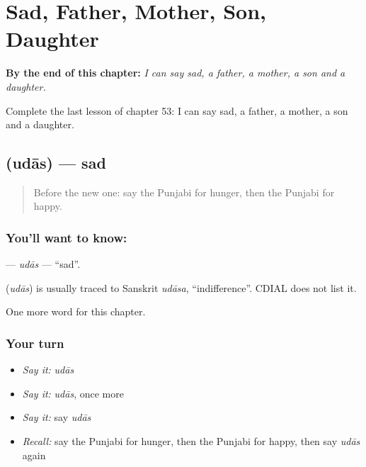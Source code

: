 
\chapter{Sad, Father, Mother, Son, Daughter}
\label{ch:pa-sad-father-mother-son-daughter}

\begin{chapteropening}
\textbf{By the end of this chapter:} \emph{I can say sad, a father, a mother, a son and a daughter.}

Complete the last lesson of chapter 53: I can say sad, a father, a mother, a son and a daughter.
\end{chapteropening}

\section[\texorpdfstring{\pa{ਉਦਾਸ} (udās)}{ਉਦਾਸ (udās)}]{ (udās) — sad}

\label{lesson:PA-C53-udas}



\begin{quote}
Before the new one: say the Punjabi for hunger, then the Punjabi for happy.
\end{quote}

\subsection*{You'll want to know: }
\textbf{} — \emph{udās} — \textquotedblleft{}sad\textquotedblright{}.

\begin{cousinweb}
\textbf{} (\emph{udās}) is usually traced to Sanskrit \emph{udāsa}, \textquotedblleft{}indifference\textquotedblright{}. CDIAL does not list it.
\end{cousinweb}

\begin{grammarlens}[title={What you've built}]
One more word for this chapter.
\end{grammarlens}

\subsection*{Your turn}
\begin{itemize}
\raggedright
  \item \emph{Say it:} \emph{udās}
  \item \emph{Say it:} \emph{udās}, once more
  \item \emph{Say it:} say \emph{udās}
  \item \emph{Recall:} say the Punjabi for hunger, then the Punjabi for happy, then say \emph{udās} again
\end{itemize}

